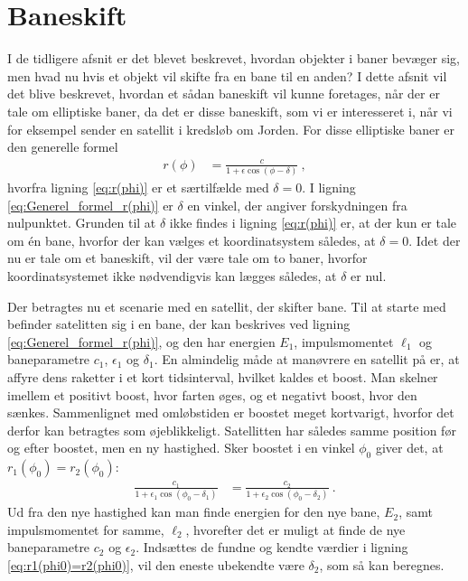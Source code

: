 \section{Baneskift}
I de tidligere afsnit er det blevet beskrevet, hvordan objekter i baner bevæger sig, men hvad nu hvis et objekt vil skifte fra en bane til en anden? I dette afsnit vil det blive beskrevet, hvordan et sådan baneskift vil kunne foretages, når der er tale om elliptiske baner, da det er disse baneskift, som vi er interesseret i, når vi for eksempel sender en satellit i kredsløb om Jorden. For disse elliptiske baner er den generelle formel
\begin{align} \label{eq:Generel_formel_r(phi)}
	r(\phi) &= \frac{c}{1+\epsilon\cos(\phi-\delta)} \: ,
\end{align}
hvorfra ligning \eqref{eq:r(phi)} er et særtilfælde med $\delta = 0$. I ligning \eqref{eq:Generel_formel_r(phi)} er $\delta$ en vinkel, der angiver forskydningen fra nulpunktet. Grunden til at $\delta$ ikke findes i ligning \eqref{eq:r(phi)} er, at der kun er tale om én bane, hvorfor der kan vælges et koordinatsystem således, at $\delta = 0$. Idet der nu er tale om et baneskift, vil der være tale om to baner, hvorfor koordinatsystemet ikke nødvendigvis kan lægges således, at $\delta$ er nul.

\noindent
Der betragtes nu et scenarie med en satellit, der skifter bane. Til at starte med befinder satelitten sig i en bane, der kan beskrives ved ligning \eqref{eq:Generel_formel_r(phi)}, og den har energien $E_1$, impulsmomentet $\ell_1$ og baneparametre $c_1$, $\epsilon_1$ og $\delta_1$. En almindelig måde at manøvrere en satellit på er, at affyre dens raketter i et kort tidsinterval, hvilket kaldes et boost. Man skelner imellem et positivt boost, hvor farten øges, og et negativt boost, hvor den sænkes. Sammenlignet med omløbstiden er boostet meget kortvarigt, hvorfor det derfor kan betragtes som øjeblikkeligt. Satellitten har således samme position før og efter boostet, men en ny hastighed. Sker boostet i en vinkel $\phi_0$ giver det, at $r_1(\phi_0) = r_2(\phi_0)$:
\begin{align} \label{eq:r1(phi0)=r2(phi0)}
	\frac{c_1}{1+\epsilon_1\cos(\phi_0-\delta_1)} &= \frac{c_2}{1+\epsilon_2\cos(\phi_0-\delta_2)} \: .
\end{align}
Ud fra den nye hastighed kan man finde energien for den nye bane, $E_2$, samt impulsmomentet for samme, $\ell_2$, hvorefter det er muligt at finde de nye baneparametre $c_2$ og $\epsilon_2$. Indsættes de fundne og kendte værdier i ligning \ref{eq:r1(phi0)=r2(phi0)}, vil den eneste ubekendte være $\delta_2$, som så kan beregnes.

